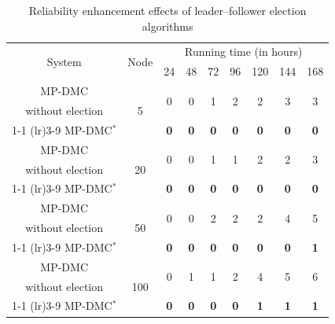 \documentclass[twoside,twocolumn]{article}
\begin{document}
\begin{table}[htp!]
	\small
	\centering
	\caption{Reliability enhancement effects of leader--follower election algorithms}
	\label{Table:1}
	\begin{tabular*}{\columnwidth}{@{\extracolsep{\fill}} ccccccccc }
	\toprule[0.75pt]
	\multirow{2}{*}{System} & \multirow{2}{*}{Node} & \multicolumn{7}{c}{Running time (in hours)} \\
	& & 24 & 48 & 72 & 96 & 120 & 144 & 168 \\
	\midrule[0.5pt]
	MP-DMC & \multirow{3}{*}{5} & \multirow{2}{*}{0} & \multirow{2}{*}{0} & \multirow{2}{*}{1} & \multirow{2}{*}{2} & \multirow{2}{*}{2} & \multirow{2}{*}{3} & \multirow{2}{*}{3} \\
	without election &  &  &  &  &  &  &  &  \\
	\cmidrule(lr){1-1} \cmidrule(lr){3-9}
	MP-DMC$^*$ &  & \textbf{0} & \textbf{0} & \textbf{0} & \textbf{0} & \textbf{0} & \textbf{0} & \textbf{0} \\
	\midrule[0.5pt]
	MP-DMC & \multirow{3}{*}{20} & \multirow{2}{*}{0} & \multirow{2}{*}{0} & \multirow{2}{*}{1} & \multirow{2}{*}{1} & \multirow{2}{*}{2} & \multirow{2}{*}{2} & \multirow{2}{*}{3} \\
	without election &  &  &  &  &  &  &  &  \\
	\cmidrule(lr){1-1} \cmidrule(lr){3-9}
	MP-DMC$^*$ &  & \textbf{0} & \textbf{0} & \textbf{0} & \textbf{0} & \textbf{0} & \textbf{0} & \textbf{0} \\
	\midrule[0.5pt]
	MP-DMC & \multirow{3}{*}{50} & \multirow{2}{*}{0} & \multirow{2}{*}{0} & \multirow{2}{*}{2} & \multirow{2}{*}{2} & \multirow{2}{*}{2} & \multirow{2}{*}{4} & \multirow{2}{*}{5} \\
	without election &  &  &  &  &  &  &  &  \\
	\cmidrule(lr){1-1} \cmidrule(lr){3-9}
	MP-DMC$^*$ &  & \textbf{0} & \textbf{0} & \textbf{0} & \textbf{0} & \textbf{0} & \textbf{0} & \textbf{1} \\
	\midrule[0.5pt]
	MP-DMC & \multirow{3}{*}{100} & \multirow{2}{*}{0} & \multirow{2}{*}{1} & \multirow{2}{*}{1} & \multirow{2}{*}{2} & \multirow{2}{*}{4} & \multirow{2}{*}{5} & \multirow{2}{*}{6} \\
	without election &  &  &  &  &  &  &  &  \\
	\cmidrule(lr){1-1} \cmidrule(lr){3-9}
	MP-DMC$^*$ &  & \textbf{0} & \textbf{0} & \textbf{0} & \textbf{0} & \textbf{1} & \textbf{1} & \textbf{1} \\
	\bottomrule[0.75pt]
	\end{tabular*}
\end{table}
\end{document}
